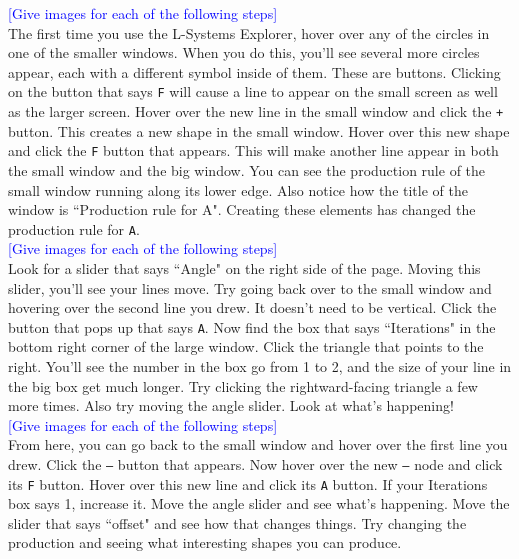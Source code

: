 \documentclass[12pt,twoside]{reedthesis}
\newcommand{\code}[1]{\texttt{#1}}
\begin{document}
	
	\textcolor{blue}{[Give images for each of the following steps]}\\
	
	The first time you use the L-Systems Explorer, hover over any of the circles in one of the smaller windows. When you do this, you'll see several more circles appear, each with a different symbol inside of them. These are buttons. Clicking on the button that says \code{F} will cause a line to appear on the small screen as well as the larger screen. Hover over the new line in the small window and click the \code{+} button. This creates a new shape in the small window. Hover over this new shape and click the \code{F} button that appears. This will make another line appear in both the small window and the big window. You can see the production rule of the small window running along its lower edge. Also notice how the title of the window is ``Production rule for A". Creating these elements has changed the production rule for \code{A}.\\
	
	\textcolor{blue}{[Give images for each of the following steps]}\\
	
	Look for a slider that says ``Angle" on the right side of the page. Moving this slider, you'll see your lines move. Try going back over to the small window and hovering over the second line you drew. It doesn't need to be vertical. Click the button that pops up that says \code{A}. Now find the box that says ``Iterations" in the bottom right corner of the large window. Click the triangle that points to the right. You'll see the number in the box go from 1 to 2, and the size of your line in the big box get much longer. Try clicking the rightward-facing triangle a few more times. Also try moving the angle slider. Look at what's happening!\\
	
	\textcolor{blue}{[Give images for each of the following steps]}\\
	
	From here, you can go back to the small window and hover over the first line you drew. Click the \code{–} button that appears. Now hover over the new \code{–} node and click its \code{F} button. Hover over this new line and click its \code{A} button. If your Iterations box says 1, increase it. Move the angle slider and see what's happening. Move the slider that says ``offset" and see how that changes things. Try changing the production and seeing what interesting shapes you can produce.\\
	
\end{document}
